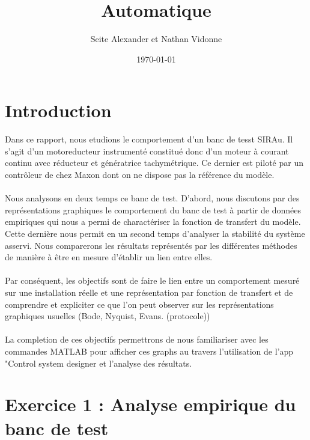\documentclass[letterpaper,12pt]{article}
\begin{document}
\title{Automatique}

\author{Seite Alexander et Nathan Vidonne}
\date{\today}
\maketitle
\newline

\tableofcontents

\newpage

\section{Introduction}
Dans ce rapport, nous etudions le comportement d'un banc de tesst SIRAu. Il s'agit d'un motoreducteur instrumenté constitué donc d'un moteur à courant continu avec réducteur et génératrice tachymétrique. Ce dernier est piloté par un contrôleur de chez Maxon dont on ne dispose pas la référence du modèle.
\\\\
Nous analysons en deux temps ce banc de test. D'abord, nous discutons par des représentations graphiques le comportement du banc de test à partir de données empiriques qui nous a permi de charactériser la fonction de transfert du modèle. Cette dernière nous permit en un second temps d'analyser la stabilité du système asservi. Nous comparerons les résultats représentés par les différentes méthodes de manière à être en mesure d’établir un lien entre elles.
\\\\
Par conséquent, les objectifs sont de faire le lien entre un comportement mesuré sur une installation réelle et une représentation par fonction de transfert et de comprendre et expliciter ce que l’on peut observer sur les représentations graphiques usuelles (Bode, Nyquist, Evans. (protocole)) 
\\\\
La completion de ces objectifs permettrons de nous familiariser avec les commandes MATLAB pour afficher ces graphs au travers l'utilisation de l'app "Control system designer et l'analyse des résultats. \\
\section{Exercice 1 : Analyse empirique du banc de test}
\end{document}
